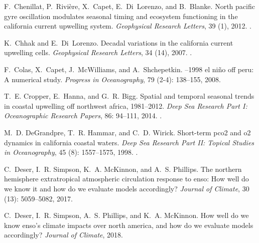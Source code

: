 \documentclass[hvmath, online,bgd]{copernicus_discussions}
\begin{document}
\begin{thebibliography}{84}
	F.~Chenillat, P.~Rivi{\`e}re, X.~Capet, E.~Di~Lorenzo, and B.~Blanke.
	\newblock North pacific gyre oscillation modulates seasonal timing and
	ecosystem functioning in the california current upwelling system.
	\newblock \emph{Geophysical Research Letters}, 39 (1), 2012.
	\newblock {}.
	
	K.~Chhak and E.~Di~Lorenzo.
	\newblock Decadal variations in the california current upwelling cells.
	\newblock \emph{Geophysical Research Letters}, 34 (14), 2007.
	\newblock {}.
	
	F.~Colas, X.~Capet, J.~McWilliams, and A.~Shchepetkin.
	--1998 el ni{\~n}o off peru: A numerical study.
	\newblock \emph{Progress in Oceanography}, 79 (2-4):
	138--155, 2008.
	
	T.~E. Cropper, E.~Hanna, and G.~R. Bigg.
	\newblock Spatial and temporal seasonal trends in coastal upwelling off
	northwest africa, 1981--2012.
	\newblock \emph{Deep Sea Research Part I: Oceanographic Research Papers},
	86: 94--111, 2014.
	\newblock {}.
	
	M.~D. DeGrandpre, T.~R. Hammar, and C.~D. Wirick.
	\newblock Short-term pco2 and o2 dynamics in california coastal waters.
	\newblock \emph{Deep Sea Research Part II: Topical Studies in Oceanography},
	45 (8): 1557--1575, 1998.
	\newblock {}.
	
	C.~Deser, I.~R. Simpson, K.~A. McKinnon, and A.~S. Phillips.
	\newblock The northern hemisphere extratropical atmospheric circulation
	response to enso: How well do we know it and how do we evaluate models
	accordingly?
	\newblock \emph{Journal of Climate}, 30 (13): 5059--5082,
	2017.
	
	C.~Deser, I.~R. Simpson, A.~S. Phillips, and K.~A. McKinnon.
	\newblock How well do we know enso's climate impacts over north america, and
	how do we evaluate models accordingly?
	\newblock \emph{Journal of Climate}, 2018.
	

\end{thebibliography}
\end{document}
